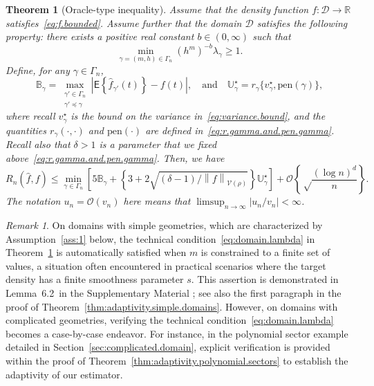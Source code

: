 \documentclass[bj,authoryear]{imsart}
\numberwithin{equation}{section}
\theoremstyle{plain}
\newtheorem{theorem}{Theorem}[section]
\theoremstyle{remark}
\newtheorem{remark}{Remark}
\newcommand{\R}{\mathbb{R}}
\newcommand{\EE}{\mathsf{E}}
\newcommand{\1}{\mathds{1}}
\newcommand{\domain}{\mathcal{D}}
\newcommand{\voisin}{\mathcal{V}}
\newcommand{\pwrisk}{R_n}
\newcommand{\finfty}{\left\|f\right\|_{\voisin(\rho)}}
\newcommand{\lemusualbehavior}{6.2~}
\begin{document}
    \begin{theorem}[Oracle-type inequality]\label{thm:oracle.result}
        Assume that the density function $f:\domain\to\R$ satisfies~\eqref{eq:f.bounded}. Assume further that the domain $\domain$ satisfies the following property: there exists a positive real constant $b\in (0,\infty)$ such that
        \begin{equation}\label{eq:domain.lambda}
            \min_{\gamma=(m,h)\in \Gamma_{\!n}} (h^m)^{-b} \lambda_{\gamma} \geq 1.
        \end{equation}
        Define, for any $\gamma\in \Gamma_{\!n}$,
        \begin{equation}\label{eq:B.gamma.and.U.star.gamma}
            \mathbb{B}_{\gamma} = \max_{\substack{\gamma'\in \Gamma_{\!n} \\ \gamma' \preceq \gamma}} \left|\EE\left\{\hat{f}_{\gamma'}(t)\right\} - f(t)\right|,
            \quad \text{and} \quad
            \mathbb{U}_{\gamma}^{\star} = r_{\gamma}\{v_{\gamma}^{\star}, \mathrm{pen}(\gamma)\},
        \end{equation}
        where recall $v_{\gamma}^{\star}$ is the bound on the variance in~\eqref{eq:variance.bound}, and the quantities $r_{\gamma}(\cdot,\cdot)$ and $\mathrm{pen}(\cdot)$ are defined in~\eqref{eq:r.gamma.and.pen.gamma}. Recall also that $\delta > 1$ is a parameter that we fixed above~\eqref{eq:r.gamma.and.pen.gamma}. Then, we have
        \begin{equation}\label{eq:thm:oracle.result.to.prove}
            \pwrisk(\hat{f}, f)
            \leq \min_{\gamma\in \Gamma_{\!n}} \left[5 \mathbb{B}_{\gamma} + \left\{3 + 2 \sqrt{(\delta-1) / \finfty}\right\} \mathbb{U}_{\gamma}^{\star}\right] + \mathcal{O}\left\{\sqrt\frac{(\log n)^d}{n}\right\}.
        \end{equation}
        The notation $u_n = \mathcal{O}(v_n)$ here means that $\limsup_{n\to\infty} |u_n / v_n| < \infty$.
    \end{theorem}

    \begin{remark}\upshape
        On domains with simple geometries, which are characterized by Assumption~\ref{ass:1} below, the technical condition~\eqref{eq:domain.lambda} in Theorem~\ref{thm:oracle.result} is automatically satisfied when $m$ is constrained to a finite set of values, a situation often encountered in practical scenarios where the target density has a finite smoothness parameter $s$. This assertion is demonstrated in Lemma~\lemusualbehavior in the Supplementary Material \citep{BertinKlutchnikoffOuimet2024supplement}; see also the first paragraph in the proof of Theorem~\ref{thm:adaptivity.simple.domains}. However, on domains with complicated geometries, verifying the technical condition~\eqref{eq:domain.lambda} becomes a case-by-case endeavor. For instance, in the polynomial sector example detailed in Section~\ref{sec:complicated.domain}, explicit verification is provided within the proof of Theorem~\ref{thm:adaptivity.polynomial.sectors} to establish the adaptivity of our estimator.
    \end{remark}
\end{document}
